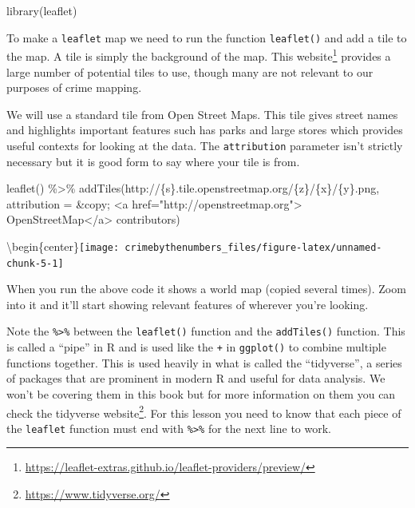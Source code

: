 \documentclass[
]{krantz}
\makeatletter
\newenvironment{Shaded}{\begin{snugshade}}{\end{snugshade}}
\newcommand{\AttributeTok}[1]{\textcolor[rgb]{0.61,0.61,0.61}{#1}}
\newcommand{\FunctionTok}[1]{\textcolor[rgb]{0,0,0}{#1}}
\newcommand{\NormalTok}[1]{#1}
\newcommand{\SpecialCharTok}[1]{\textcolor[rgb]{0,0,0}{#1}}
\newcommand{\StringTok}[1]{\textcolor[rgb]{0.5,0.5,0.5}{#1}}
\renewcommand{\href}[2]{#2\footnote{\url{#1}}}
\newenvironment{kframe}{%
\medskip{}
\setlength{\fboxsep}{.8em}
 \def\at@end@of@kframe{}%
 \ifinner\ifhmode%
  \def\at@end@of@kframe{\end{minipage}}%
  \begin{minipage}{\columnwidth}%
 \fi\fi%
 \def\FrameCommand##1{\hskip\@totalleftmargin \hskip-\fboxsep
 \colorbox{shadecolor}{##1}\hskip-\fboxsep
     \hskip-\linewidth \hskip-\@totalleftmargin \hskip\columnwidth}%
 \MakeFramed {\advance\hsize-\width
   \@totalleftmargin\z@ \linewidth\hsize
   \@setminipage}}%
 {\par\unskip\endMakeFramed%
 \at@end@of@kframe}
\renewenvironment{Shaded}{\begin{kframe}}{\end{kframe}}
\makeatother
\begin{document}
\begin{Shaded}
\begin{Highlighting}[]
\FunctionTok{library}\NormalTok{(leaflet)}
\end{Highlighting}
\end{Shaded}

To make a \texttt{leaflet} map we need to run the function \texttt{leaflet()} and add a tile to the map. A tile is simply the background of the map. This \href{https://leaflet-extras.github.io/leaflet-providers/preview/}{website} provides a large number of potential tiles to use, though many are not relevant to our purposes of crime mapping.

We will use a standard tile from Open Street Maps. This tile gives street names and highlights important features such has parks and large stores which provides useful contexts for looking at the data. The \texttt{attribution} parameter isn't strictly necessary but it is good form to say where your tile is from.

\begin{Shaded}
\begin{Highlighting}[]
\FunctionTok{leaflet}\NormalTok{() }\SpecialCharTok{\%\textgreater{}\%} 
  \FunctionTok{addTiles}\NormalTok{(}\StringTok{\textquotesingle{}http://\{s\}.tile.openstreetmap.org/\{z\}/\{x\}/\{y\}.png\textquotesingle{}}\NormalTok{, }
           \AttributeTok{attribution =} \StringTok{\textquotesingle{}\&copy; \textless{}a href="http://openstreetmap.org"\textgreater{}}
\StringTok{                OpenStreetMap\textless{}/a\textgreater{} contributors\textquotesingle{}}\NormalTok{)}
\end{Highlighting}
\end{Shaded}

\textbackslash begin\{center\}\texttt{[image: crimebythenumbers\_files/figure-latex/unnamed-chunk-5-1]}

When you run the above code it shows a world map (copied several times). Zoom into it and it'll start showing relevant features of wherever you're looking.

Note the \texttt{\%\textgreater{}\%} between the \texttt{leaflet()} function and the \texttt{addTiles()} function. This is called a ``pipe'' in R and is used like the \texttt{+} in \texttt{ggplot()} to combine multiple functions together. This is used heavily in what is called the ``tidyverse'', a series of packages that are prominent in modern R and useful for data analysis. We won't be covering them in this book but for more information on them you can check the \href{https://www.tidyverse.org/}{tidyverse website}. For this lesson you need to know that each piece of the \texttt{leaflet} function must end with \texttt{\%\textgreater{}\%} for the next line to work.
\end{document}
